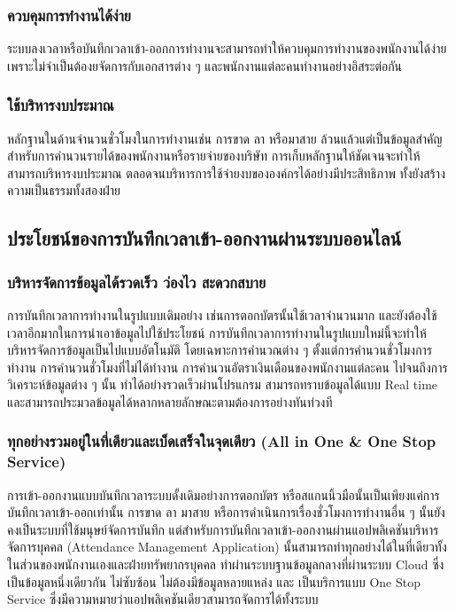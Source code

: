 \subsubsection{ควบคุมการทำงานได้ง่าย}
\quad ระบบลงเวลาหรือบันทึกเวลาเข้า-ออกการทำงานจะสามารถทำให้ควบคุมการทำงานของพนักงานได้ง่าย เพราะไม่จำเป็นต้องยจัดการกับเอกสารต่าง ๆ และพนักงานแต่ละคนทำงานอย่างอิสระต่อกัน 
\subsubsection{ใช้บริหารงบประมาณ}
\quad หลักฐานในด้านจำนวนชั่วโมงในการทำงานเช่น การขาด ลา หรือมาสาย ล้วนแล้วแต่เป็นข้อมูลสำคัญสำหรับการคำนวนรายได้ของพนักงานหรือรายจ่ายของบริษัท 
การเก็บหลักฐานให้ชัดเจนจะทำให้สามารถบริหารงบประมาณ ตลอดจนบริหารการใช้จ่ายงบขององค์กรได้อย่างมีประสิทธิภาพ ทั้งยังสร้างความเป็นธรรมทั้งสองฝ่าย

\subsection{ประโยชน์ของการบันทึกเวลาเข้า-ออกงานผ่านระบบออนไลน์}
\subsubsection{บริหารจัดการข้อมูลได้รวดเร็ว ว่องไว สะดวกสบาย}
\quad การบันทึกเวลาการทำงานในรูปแบบเดิมอย่าง เช่นการตอกบัตรนั้นใช้เวลาจำนวนมาก และยังต้องใช้เวลาอีกมากในการนำเอาข้อมูลไปใช้ประโยชน์ 
การบันทึกเวลาการทำงานในรูปแบบใหม่นี้จะทำให้บริหารจัดการข้อมูลเป็นไปแบบอัตโนมัติ โดยเฉพาะการคำนวณต่าง ๆ ตั้งแต่การคำนวนชั่วโมงการทำงาน การคำนวนชั่วโมงที่ไม่ได้ทำงาน การคำนวนอัตราเงินเดือนของพนักงานแต่ละคน ไปจนถึงการวิเคราะห์ข้อมูลต่าง ๆ นั้น ทำได้อย่างรวดเร็วผ่านโปรแกรม สามารถทราบข้อมูลได้แบบ Real time และสามารถประมวลข้อมูลได้หลากหลายลักษณะตามต้องการอย่างทันท่วงที 
\subsubsection{ทุกอย่างรวมอยู่ในที่เดียวและเบ็ดเสร็จในจุดเดียว (All in One \& One Stop Service)}
\quad การเข้า-ออกงานแบบบันทึกเวลาระบบดั้งเดิมอย่างการตอกบัตร หรือสแกนนิ้วมือนั้นเป็นเพียงแค่การบันทึกเวลาเข้า-ออกเท่านั้น 
การขาด ลา มาสาย หรือการดำเนินการเรื่องชั่วโมงการทำงานอื่น ๆ นั้นยังคงเป็นระบบที่ใช้มนุษย์จัดการบันทึก 
แต่สำหรับการบันทึกเวลาเข้า-ออกงานผ่านแอปพลิเคชันบริหารจัดการบุคคล (Attendance Management Application) 
นั้นสามารถทำทุกอย่างได้ในที่เดียวทั้งในส่วนของพนักงานเองและฝ่ายทรัพยากรบุคคล ทำผ่านระบบฐานข้อมูลกลางที่ผ่านระบบ Cloud ซึ่งเป็นข้อมูลหนึ่งเดียวกัน ไม่ซับซ้อน ไม่ต้องมีข้อมูลหลายแหล่ง และ
เป็นบริการแบบ One Stop Service ซึ่งมีความหมายว่าแอปพลิเคชันเดียวสามารถจัดการได้ทั้งระบบ 
